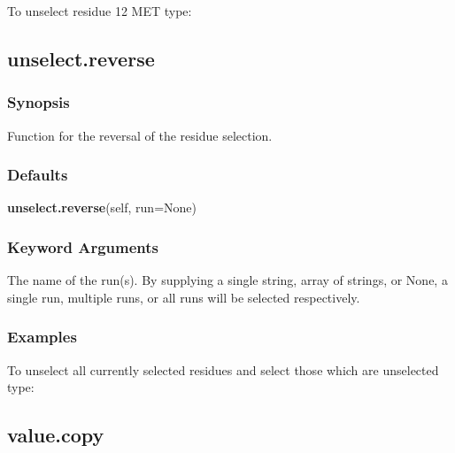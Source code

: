 

To unselect residue 12 MET type:








\newpage

\subsection{unselect.reverse}


\subsubsection{Synopsis}

Function for the reversal of the residue selection.

\subsubsection{Defaults}

\textsf{\textbf{unselect.reverse}(self, run=None)}


\subsubsection{Keyword Arguments}


  The name of the run(s).  By supplying a single string, array of strings, or None, a single run, multiple runs, or all runs will be selected respectively.

\subsubsection{Examples}

To unselect all currently selected residues and select those which are unselected type:




\newpage

\subsection{value.copy}


